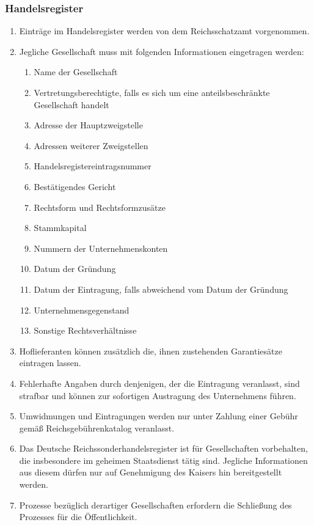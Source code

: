 \documentclass{article}
\begin{document}
\subsubsection{Handelsregister}\label{register}
\begin{enumerate}[(1)]
    \item Einträge im Handelsregister werden von dem Reichsschatzamt vorgenommen.
    \item Jegliche Gesellschaft muss mit folgenden Informationen eingetragen werden:
    \begin{enumerate}[1.]
        \item Name der Gesellschaft
        \item Vertretungsberechtigte, falls es sich um eine anteilsbeschränkte Gesellschaft handelt
        \item Adresse der Hauptzweigstelle
        \item Adressen weiterer Zweigstellen
        \item Handelsregistereintragsnummer
        \item Bestätigendes Gericht
        \item Rechtsform und Rechtsformzusätze
        \item Stammkapital
        \item Nummern der Unternehmenskonten
        \item Datum der Gründung
        \item Datum der Eintragung, falls abweichend vom Datum der Gründung
        \item Unternehmensgegenstand
        \item Sonstige Rechtsverhältnisse
    \end{enumerate}
    \item Hoflieferanten können zusätzlich die, ihnen zustehenden Garantiesätze eintragen lassen.
    \item Fehlerhafte Angaben durch denjenigen, der die Eintragung veranlasst, sind strafbar und können zur sofortigen Austragung des Unternehmens führen.
    \item Umwidmungen und Eintragungen werden nur unter Zahlung einer Gebühr gemäß Reichsgebührenkatalog veranlasst.
    \item Das Deutsche Reichssonderhandelsregister ist für Gesellschaften vorbehalten, die insbesondere im geheimen Staatsdienst tätig sind. Jegliche Informationen aus diesem dürfen nur auf Genehmigung des Kaisers hin bereitgestellt werden.
    \item Prozesse bezüglich derartiger Gesellschaften erfordern die Schließung des Prozesses für die Öffentlichkeit.
\end{enumerate}
\end{document}
